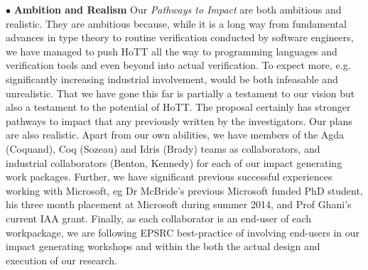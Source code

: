 \documentclass[a4paper,11pt]{article}
\begin{document}
$\bullet$ {\bf Ambition and Realism} Our {\em Pathways to Impact} are both ambitious
and realistic. They are ambitious because, while it is a long way from
fundamental advances in type theory to routine verification conducted
by software engineers, we have managed to push HoTT all the way to
programming languages and verification tools and even beyond into
actual verification. To expect more, e.g. significantly increasing
industrial involvement, would be both infeasable and unrealistic. That
we have gone this far is partially a testament to our vision
but also a testament to the potential of HoTT. The proposal certainly
has stronger pathways to impact that any previously written by the
investigators. Our plans are also realistic. Apart from our own
abilities, we have members of the Agda (Coquand), Coq (Sozeau) and
Idris (Brady) teams as collaborators, and industrial collaborators
(Benton, Kennedy) for each of our impact generating work
packages. Further, we have significant previous successful experiences
working with Microsoft, eg Dr McBride's previous Microsoft funded PhD
student, his three month placement at Microsoft during summer 2014,
and Prof Ghani's current IAA grant. Finally, as each collaborator is
an end-user of each workpackage, we are following EPSRC best-practice of
involving end-users in our impact generating workshops and within the
both the actual design and execution of our research.






\end{document}
